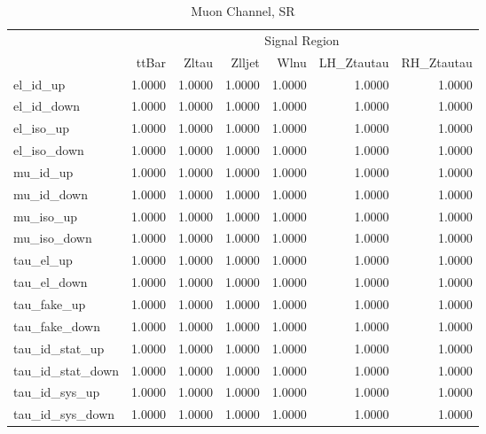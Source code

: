 \documentclass[11pt,oneside,a4paper]{article}
\begin{document}
\begin{table}
\begin{tabular}{lrrrrrr}
 & \multicolumn{6}{c}{Signal Region} \\
 & ttBar & Zltau & Zlljet & Wlnu & LH\_Ztautau & RH\_Ztautau \\
el\_id\_up & 1.0000 & 1.0000 & 1.0000 & 1.0000 & 1.0000 & 1.0000 \\
el\_id\_down & 1.0000 & 1.0000 & 1.0000 & 1.0000 & 1.0000 & 1.0000 \\
el\_iso\_up & 1.0000 & 1.0000 & 1.0000 & 1.0000 & 1.0000 & 1.0000 \\
el\_iso\_down & 1.0000 & 1.0000 & 1.0000 & 1.0000 & 1.0000 & 1.0000 \\
mu\_id\_up & 1.0000 & 1.0000 & 1.0000 & 1.0000 & 1.0000 & 1.0000 \\
mu\_id\_down & 1.0000 & 1.0000 & 1.0000 & 1.0000 & 1.0000 & 1.0000 \\
mu\_iso\_up & 1.0000 & 1.0000 & 1.0000 & 1.0000 & 1.0000 & 1.0000 \\
mu\_iso\_down & 1.0000 & 1.0000 & 1.0000 & 1.0000 & 1.0000 & 1.0000 \\
tau\_el\_up & 1.0000 & 1.0000 & 1.0000 & 1.0000 & 1.0000 & 1.0000 \\
tau\_el\_down & 1.0000 & 1.0000 & 1.0000 & 1.0000 & 1.0000 & 1.0000 \\
tau\_fake\_up & 1.0000 & 1.0000 & 1.0000 & 1.0000 & 1.0000 & 1.0000 \\
tau\_fake\_down & 1.0000 & 1.0000 & 1.0000 & 1.0000 & 1.0000 & 1.0000 \\
tau\_id\_stat\_up & 1.0000 & 1.0000 & 1.0000 & 1.0000 & 1.0000 & 1.0000 \\
tau\_id\_stat\_down & 1.0000 & 1.0000 & 1.0000 & 1.0000 & 1.0000 & 1.0000 \\
tau\_id\_sys\_up & 1.0000 & 1.0000 & 1.0000 & 1.0000 & 1.0000 & 1.0000 \\
tau\_id\_sys\_down & 1.0000 & 1.0000 & 1.0000 & 1.0000 & 1.0000 & 1.0000 \\
\end{tabular}
\caption{Muon Channel, SR}
\end{table}
\end{document}
